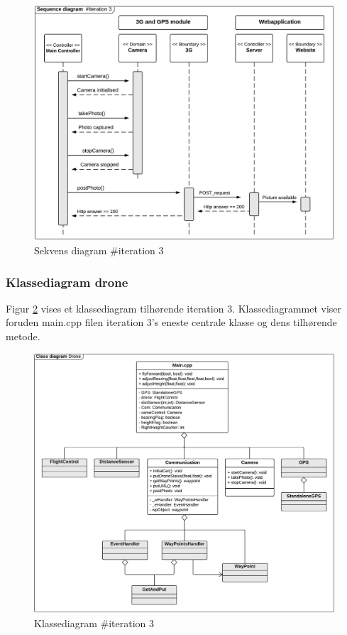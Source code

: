 \vspace{-0.2cm}
\begin{figure}[H]
	\centering
	\includegraphics[width=1\textwidth]{Billeder/sekvens/sekvens_iteration3}
	\caption{Sekvens diagram \#iteration 3}
	\label{fig:Sekvens_diagram_iteration3}
\end{figure}
\vspace{-0.2cm}

\newpage

\subsubsection*{Klassediagram drone}

Figur \ref{fig:classDiagram_iteration3} vises et klassediagram tilhørende iteration 3. Klassediagrammet viser foruden main.cpp filen iteration 3's eneste centrale klasse og dens tilhørende metode. 

\begin{figure}[H]
	\centering
	\includegraphics[width=1\textwidth]{Billeder/klasse_diagrammer/classdiagram_iteration3_drone.png}
	\vspace{-0.5cm}
	\caption{Klassediagram \#iteration 3}
	\label{fig:classDiagram_iteration3}
\end{figure}


